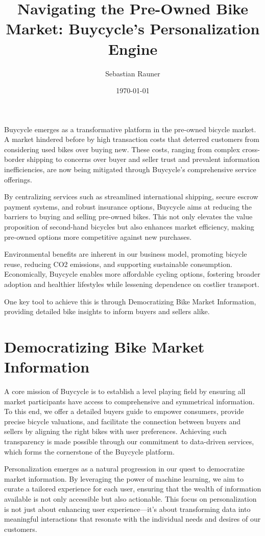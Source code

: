 \documentclass{article}
\title{Navigating the Pre-Owned Bike Market: Buycycle's Personalization Engine}
\author{Sebastian Rauner}
\date{\today}
\begin{document}
\maketitle

Buycycle emerges as a transformative platform in the pre-owned bicycle market. A market hindered before by high transaction costs that deterred customers from considering used bikes over buying new. These costs, ranging from complex cross-border shipping to concerns over buyer and seller trust and prevalent information inefficiencies, are now being mitigated through Buycycle's comprehensive service offerings.

By centralizing services such as streamlined international shipping, secure escrow payment systems, and robust insurance options, Buycycle aims at reducing the barriers to buying and selling pre-owned bikes. This not only elevates the value proposition of second-hand bicycles but also enhances market efficiency, making pre-owned options more competitive against new purchases.

Environmental benefits are inherent in our business model, promoting bicycle reuse, reducing CO2 emissions, and supporting sustainable consumption. Economically, Buycycle enables more affordable cycling options, fostering broader adoption and healthier lifestyles while lessening dependence on costlier transport.

One key tool to achieve this is through Democratizing Bike Market Information, providing detailed bike insights to inform buyers and sellers alike.

\section*{Democratizing Bike Market Information}
A core mission of Buycycle is to establish a level playing field by ensuring all market participants have access to comprehensive and symmetrical information. To this end, we offer a detailed buyers guide to empower consumers, provide precise bicycle valuations, and facilitate the connection between buyers and sellers by aligning the right bikes with user preferences. Achieving such transparency is made possible through our commitment to data-driven services, which forms the cornerstone of the Buycycle platform.

Personalization emerges as a natural progression in our quest to democratize market information. By leveraging the power of machine learning, we aim to curate a tailored experience for each user, ensuring that the wealth of information available is not only accessible but also actionable. This focus on personalization is not just about enhancing user experience—it's about transforming data into meaningful interactions that resonate with the individual needs and desires of our customers.
\end{document}

